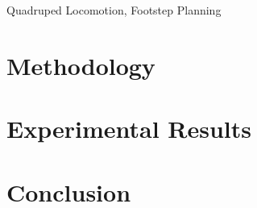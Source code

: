 \documentclass[conference]{IEEEtran}
\begin{document}
\begin{IEEEkeywords}
  Quadruped Locomotion, Footstep Planning
\end{IEEEkeywords}



\section{Methodology}
\label{sec:methodology}


\section{Experimental Results}
\label{sec:results}


\section{Conclusion}
\label{sec:conclusion}




\end{document}

